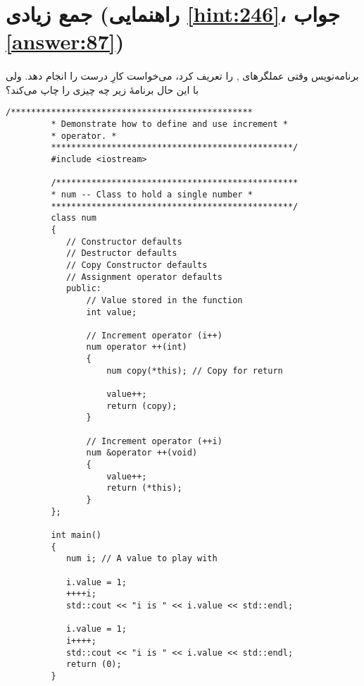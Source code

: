 \section[جمع زیادی]{جمع زیادی \protect{} (راهنمایی \ref{hint:246}، جواب \ref{answer:87})}
\paragraph{}\label{prog:51}
برنامه‌نویس وقتی عملگرهای ,  را تعریف کرد، می‌خواست کارِ درست را انجام دهد. ولی با این حال برنامهٔ زیر چه چیزی را چاپ می‌کند؟

\begin{LTR}
    \begin{lstlisting}[style=C++Style]
         /************************************************
         * Demonstrate how to define and use increment *
         * operator. *
         ************************************************/
         #include <iostream>

         /************************************************
         * num -- Class to hold a single number *
         ************************************************/
         class num
         {
         	// Constructor defaults
         	// Destructor defaults
         	// Copy Constructor defaults
         	// Assignment operator defaults
         	public:
         		// Value stored in the function
         		int value;

         		// Increment operator (i++)
         		num operator ++(int)
         		{
         			num copy(*this); // Copy for return

         			value++;
         			return (copy);
         		}

         		// Increment operator (++i)
         		num &operator ++(void)
         		{
         			value++;
         			return (*this);
         		}
         };

         int main()
         {
         	num i; // A value to play with

         	i.value = 1;
         	++++i;
         	std::cout << "i is " << i.value << std::endl;

         	i.value = 1;
         	i++++;
         	std::cout << "i is " << i.value << std::endl;
         	return (0);
         }
    \end{lstlisting}
\end{LTR}
